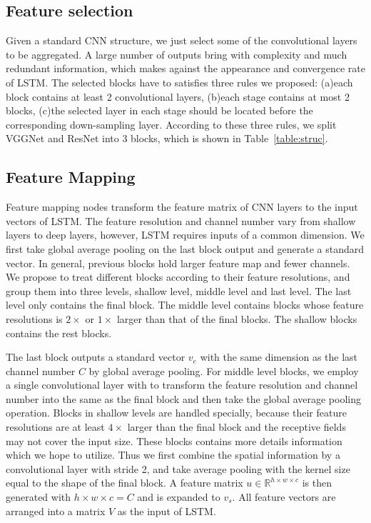 \documentclass[runningheads]{llncs}
\begin{document}
\subsection{Feature selection}
Given a standard CNN structure, we just select some of the convolutional layers to be aggregated. A large number of outputs bring with complexity and much redundant information, which makes against the appearance and convergence rate of LSTM. The selected blocks have to satisfies three rules we proposed: (a)each block contains at least 2 convolutional layers, (b)each stage contains at most 2 blocks, (c)the selected layer in each stage should be located before the corresponding down-sampling layer. According to these three rules, we split VGGNet and ResNet into 3 blocks, which is shown in Table~\ref{table:struc}.
\subsection{Feature Mapping}

Feature mapping nodes transform the feature matrix of CNN layers to the input vectors of LSTM. The feature resolution and channel number vary from shallow layers to deep layers, however, LSTM requires inputs of a common dimension. We first take global average pooling on the last block output and generate a standard vector. In general, previous blocks hold larger feature map and fewer channels. We propose to treat different blocks according to their feature resolutions, and group them into three levels, shallow level, middle level and last level. The last level only contains the final block. The middle level contains blocks whose feature resolutions is $2\times$ or $1\times$ larger than that of the final blocks. The shallow blocks contains the rest blocks. 

The last block outputs a standard vector $v_e$ with the same dimension as the last channel number $C$ by global average pooling. For middle level blocks, we employ a single convolutional layer with to transform the feature resolution and channel number into the same as the final block and then take the global average pooling operation. Blocks in shallow levels are handled specially, because their feature resolutions are at least $4\times$ larger than the final block and the receptive fields may not cover the input size. These blocks contains more details information which we hope to utilize. Thus we first combine the spatial information by a convolutional layer with stride 2, and take average pooling with the kernel size equal to the shape of the final block. A feature matrix $u \in \mathbb{R}^{h\times w \times c}$ is then generated with $h\times w \times c = C$ and is expanded to $v_s$. All feature vectors are arranged into a matrix $V$ as the input of LSTM.
\end{document}
